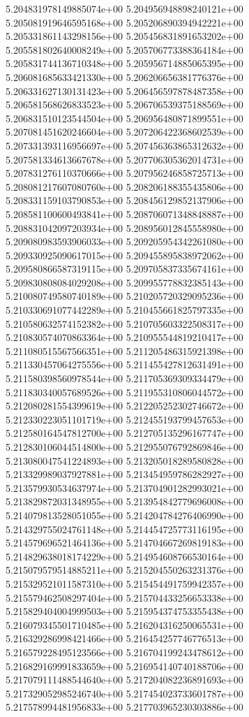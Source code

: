 5.204831978149885074e+00
5.204956948898240121e+00
5.205081919646595168e+00
5.205206890394942221e+00
5.205331861143298156e+00
5.205456831891653202e+00
5.205581802640008249e+00
5.205706773388364184e+00
5.205831744136710348e+00
5.205956714885065395e+00
5.206081685633421330e+00
5.206206656381776376e+00
5.206331627130131423e+00
5.206456597878487358e+00
5.206581568626833523e+00
5.206706539375188569e+00
5.206831510123544504e+00
5.206956480871899551e+00
5.207081451620246604e+00
5.207206422368602539e+00
5.207331393116956697e+00
5.207456363865312632e+00
5.207581334613667678e+00
5.207706305362014731e+00
5.207831276110370666e+00
5.207956246858725713e+00
5.208081217607080760e+00
5.208206188355435806e+00
5.208331159103790853e+00
5.208456129852137906e+00
5.208581100600493841e+00
5.208706071348848887e+00
5.208831042097203934e+00
5.208956012845558980e+00
5.209080983593906033e+00
5.209205954342261080e+00
5.209330925090617015e+00
5.209455895838972062e+00
5.209580866587319115e+00
5.209705837335674161e+00
5.209830808084029208e+00
5.209955778832385143e+00
5.210080749580740189e+00
5.210205720329095236e+00
5.210330691077442289e+00
5.210455661825797335e+00
5.210580632574152382e+00
5.210705603322508317e+00
5.210830574070863364e+00
5.210955544819210417e+00
5.211080515567566351e+00
5.211205486315921398e+00
5.211330457064275556e+00
5.211455427812631491e+00
5.211580398560978544e+00
5.211705369309334479e+00
5.211830340057689526e+00
5.211955310806044572e+00
5.212080281554399619e+00
5.212205252302746672e+00
5.212330223051101719e+00
5.212455193799457653e+00
5.212580164547812700e+00
5.212705135296167747e+00
5.212830106044514800e+00
5.212955076792869846e+00
5.213080047541224893e+00
5.213205018289580828e+00
5.213329989037927881e+00
5.213454959786282927e+00
5.213579930534637974e+00
5.213704901282993021e+00
5.213829872031348955e+00
5.213954842779696008e+00
5.214079813528051055e+00
5.214204784276406990e+00
5.214329755024761148e+00
5.214454725773116195e+00
5.214579696521464136e+00
5.214704667269819183e+00
5.214829638018174229e+00
5.214954608766530164e+00
5.215079579514885211e+00
5.215204550263231376e+00
5.215329521011587310e+00
5.215454491759942357e+00
5.215579462508297404e+00
5.215704433256653338e+00
5.215829404004999503e+00
5.215954374753355438e+00
5.216079345501710485e+00
5.216204316250065531e+00
5.216329286998421466e+00
5.216454257746776513e+00
5.216579228495123566e+00
5.216704199243478612e+00
5.216829169991833659e+00
5.216954140740188706e+00
5.217079111488544640e+00
5.217204082236891693e+00
5.217329052985246740e+00
5.217454023733601787e+00
5.217578994481956833e+00
5.217703965230303886e+00
